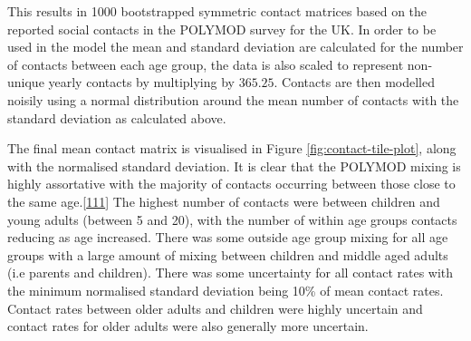 \documentclass[11pt,twoside]{bristolthesis}
\begin{document}
  This results in 1000 bootstrapped symmetric contact matrices based on the reported social contacts in the POLYMOD survey for the UK. In order to be used in the model the mean and standard deviation are calculated for the number of contacts between each age group, the data is also scaled to represent non-unique yearly contacts by multiplying by \(365.25\). Contacts are then modelled noisily using a normal distribution around the mean number of contacts with the standard deviation as calculated above.
  
  The final mean contact matrix is visualised in Figure \ref{fig:contact-tile-plot}, along with the normalised standard deviation. It is clear that the POLYMOD mixing is highly assortative with the majority of contacts occurring between those close to the same age.{[}\protect\hyperlink{ref-Mossong2008}{111}{]} The highest number of contacts were between children and young adults (between 5 and 20), with the number of within age groups contacts reducing as age increased. There was some outside age group mixing for all age groups with a large amount of mixing between children and middle aged adults (i.e parents and children). There was some uncertainty for all contact rates with the minimum normalised standard deviation being 10\% of mean contact rates. Contact rates between older adults and children were highly uncertain and contact rates for older adults were also generally more uncertain.
\end{document}
